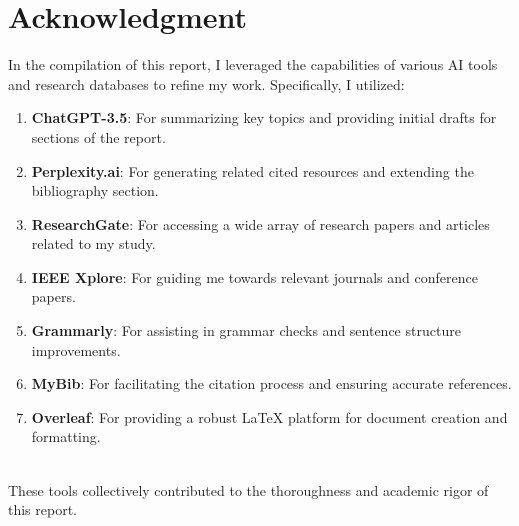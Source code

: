 \documentclass[12pt]{article}
\begin{document}
\section*{Acknowledgment}

In the compilation of this report, I leveraged the capabilities of various AI tools and research databases to refine my work. Specifically, I utilized:

\begin{enumerate}
    \item \textbf{ChatGPT-3.5}: For summarizing key topics and providing initial drafts for sections of the report.
    \item \textbf{Perplexity.ai}: For generating related cited resources and extending the bibliography section.
    \item \textbf{ResearchGate}: For accessing a wide array of research papers and articles related to my study.
    \item \textbf{IEEE Xplore}: For guiding me towards relevant journals and conference papers.
    \item \textbf{Grammarly}: For assisting in grammar checks and sentence structure improvements.
    \item \textbf{MyBib}: For facilitating the citation process and ensuring accurate references.
    \item \textbf{Overleaf}: For providing a robust LaTeX platform for document creation and formatting.
\end{enumerate} \\
These tools collectively contributed to the thoroughness and academic rigor of this report.
\end{document}
